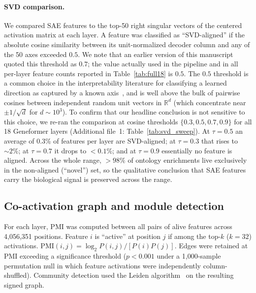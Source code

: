 \documentclass[onecolumn]{article}
\begin{document}
\paragraph{SVD comparison.} We compared SAE features to the top-50 right singular vectors of the centered activation matrix at each layer. A feature was classified as ``SVD-aligned'' if the absolute cosine similarity between its unit-normalized decoder column and any of the 50 axes exceeded $0.5$. We note that an earlier version of this manuscript quoted this threshold as $0.7$; the value actually used in the pipeline and in all per-layer feature counts reported in Table~\ref{tab:full18} is $0.5$. The $0.5$ threshold is a common choice in the interpretability literature for classifying a learned direction as captured by a known axis~\cite{bricken2023monosemanticity,cunningham2023sparse,gao2024scaling}, and is well above the bulk of pairwise cosines between independent random unit vectors in $\mathbb{R}^{d}$ (which concentrate near $\pm 1/\sqrt{d}$ for $d\sim 10^{3}$). To confirm that our headline conclusion is not sensitive to this choice, we re-ran the comparison at cosine thresholds $\{0.3, 0.5, 0.7, 0.9\}$ for all 18 Geneformer layers (Additional file~1: Table~\ref{tab:svd_sweep}). At $\tau{=}0.5$ an average of 0.3\% of features per layer are SVD-aligned; at $\tau{=}0.3$ that rises to $\sim 2\%$; at $\tau{=}0.7$ it drops to $<0.1\%$; and at $\tau{=}0.9$ essentially no feature is aligned. Across the whole range, $>98\%$ of ontology enrichments live exclusively in the non-aligned (``novel'') set, so the qualitative conclusion that SAE features carry the biological signal is preserved across the range.

\subsection{Co-activation graph and module detection}

For each layer, PMI was computed between all pairs of alive features across 4,056,351 positions. Feature $i$ is ``active'' at position $j$ if among the top-$k$ ($k{=}32$) activations. $\text{PMI}(i,j) = \log_2 P(i,j) / [P(i)P(j)]$. Edges were retained at PMI exceeding a significance threshold ($p < 0.001$ under a 1,000-sample permutation null in which feature activations were independently column-shuffled). Community detection used the Leiden algorithm~\cite{traag2019louvain} on the resulting signed graph.
\end{document}
